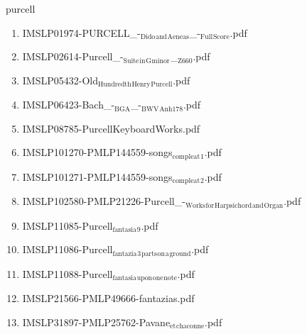 \documentclass[11pt]{article}
\begin{document}
\item purcell
\label{sec-1-1-1-1-44-52}
\begin{enumerate}
\item IMSLP01974-PURCELL\_-$_{\text{Dido}}$$_{\text{and}}$$_{\text{Aeneas}}$\_-$_{\text{Full}}$$_{\text{Score}}$.pdf
\label{sec-1-1-1-1-44-52-1}

\item IMSLP02614-Purcell\_-$_{\text{Suite}}$$_{\text{in}}$$_{\text{G}}$$_{\text{minor}}$\_$_{\text{Z660}}$.pdf
\label{sec-1-1-1-1-44-52-2}

\item IMSLP05432-Old$_{\text{Hundredth}}$$_{\text{Henry}}$$_{\text{Purcell}}$.pdf
\label{sec-1-1-1-1-44-52-3}

\item IMSLP06423-Bach\_-$_{\text{BGA}}$\_-$_{\text{BWV}}$$_{\text{Anh178}}$.pdf
\label{sec-1-1-1-1-44-52-4}

\item IMSLP08785-PurcellKeyboardWorks.pdf
\label{sec-1-1-1-1-44-52-5}

\item IMSLP101270-PMLP144559-songs$_{\text{compleat}}$$_{\text{1}}$.pdf
\label{sec-1-1-1-1-44-52-6}

\item IMSLP101271-PMLP144559-songs$_{\text{compleat}}$$_{\text{2}}$.pdf
\label{sec-1-1-1-1-44-52-7}

\item IMSLP102580-PMLP21226-Purcell\_-$_{\text{Works}}$$_{\text{for}}$$_{\text{Harpsichord}}$$_{\text{and}}$$_{\text{Organ}}$.pdf
\label{sec-1-1-1-1-44-52-8}

\item IMSLP11085-Purcell$_{\text{fantasia}}$$_{\text{9}}$.pdf
\label{sec-1-1-1-1-44-52-9}

\item IMSLP11086-Purcell$_{\text{fantazia}}$$_{\text{3}}$$_{\text{parts}}$$_{\text{on}}$$_{\text{a}}$$_{\text{ground}}$.pdf
\label{sec-1-1-1-1-44-52-10}

\item IMSLP11088-Purcell$_{\text{fantasia}}$$_{\text{upon}}$$_{\text{one}}$$_{\text{note}}$.pdf
\label{sec-1-1-1-1-44-52-11}

\item IMSLP21566-PMLP49666-fantazias.pdf
\label{sec-1-1-1-1-44-52-12}

\item IMSLP31897-PMLP25762-Pavane$_{\text{et}}$$_{\text{chaconne}}$.pdf
\label{sec-1-1-1-1-44-52-13}


\end{enumerate}
\end{document}
